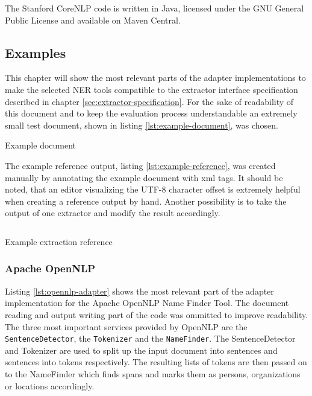 The Stanford CoreNLP code is written in Java, licensed under the GNU General Public License and available on Maven Central.

\subsection{Examples}
This chapter will show the most relevant parts of the adapter implementations to make the selected \gls{NER} tools compatible to the extractor interface specification described in chapter \ref{sec:extractor-specification}. For the sake of readability of this document and to keep the evaluation process understandable an extremely small test document, shown in listing \ref{lst:example-document}, was chosen.

\begin{listing}[H]
\texttt{}
\caption{Example document}
\label{lst:example-document}
\end{listing}

The example reference output, listing \ref{lst:example-reference}, was created manually by annotating the example document with xml tags. It should be noted, that an editor visualizing the UTF-8 character offset is extremely helpful when creating a reference output by hand. Another possibility is to take the output of one extractor and modify the result accordingly.

\begin{listing}[H]
\inputminted{xml}{reference.xml}
\caption{Example extraction reference}
\label{lst:example-reference}
\end{listing}

\subsubsection{Apache OpenNLP}
Listing \ref{lst:opennlp-adapter} shows the most relevant part of the adapter implementation for the Apache OpenNLP Name Finder Tool. The document reading and output writing part of the code was ommitted to improve readability. The three most important services provided by OpenNLP are the \texttt{SentenceDetector}, the \texttt{Tokenizer} and the \texttt{NameFinder}. The SentenceDetector and Tokenizer are used to split up the input document into sentences and sentences into tokens respectively. The resulting lists of tokens are then passed on to the NameFinder which finds spans and marks them as persons, organizations or locations accordingly.

